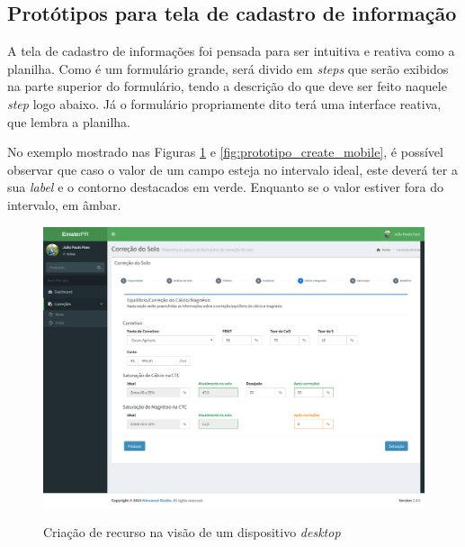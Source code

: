 \subsection{Protótipos para tela de cadastro de informação}
\label{sec:titSecPrototiposCreate}

A tela de cadastro de informações foi pensada para ser intuitiva e reativa como a planilha. Como é um formulário grande, será divido em \textit{steps} que serão exibidos na parte superior do formulário, tendo a descrição do que deve ser feito naquele \textit{step} logo abaixo. Já o formulário propriamente dito terá uma interface reativa, que lembra a planilha.

No exemplo mostrado nas Figuras \ref{fig:prototipo_create_desk} e \ref{fig:prototipo_create_mobile}, é possível observar que caso o valor de um campo esteja no intervalo ideal, este deverá ter a sua \textit{label} e o contorno destacados em verde. Enquanto se o valor estiver fora do intervalo, em âmbar. 

\begin{figure}[H]
    \centering
    \caption{Criação de recurso na visão de um dispositivo \textit{desktop}}
    \includegraphics[width=13cm]{./dados/figuras/prototipos/create_desktop.png}
    \label{fig:prototipo_create_desk}
\end{figure}

